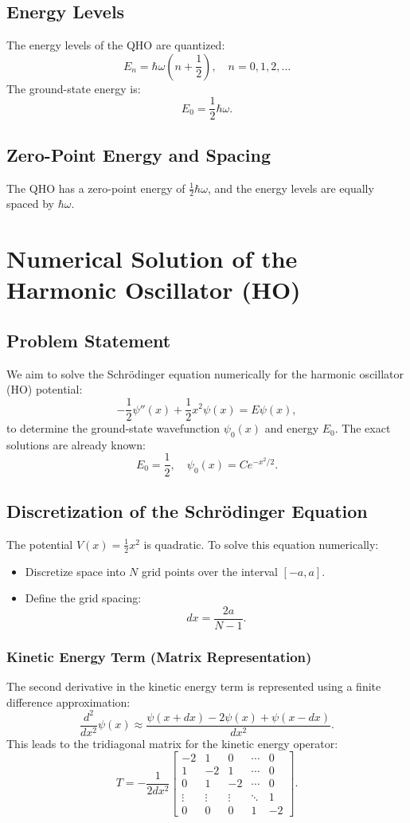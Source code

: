 \documentclass[a4paper,12pt]{article}
\begin{document}
\begin{multicols}{2}
\subsection*{Energy Levels}
The energy levels of the QHO are quantized:
\[
E_n = \hbar\omega\left(n + \frac{1}{2}\right), \quad n = 0, 1, 2, \dots
\]
The ground-state energy is:
\[
E_0 = \frac{1}{2}\hbar\omega.
\]

\subsection*{Zero-Point Energy and Spacing}
The QHO has a zero-point energy of \( \frac{1}{2}\hbar\omega \), and the energy levels are equally spaced by \( \hbar\omega \).

\section{Numerical Solution of the Harmonic Oscillator (HO)}

\subsection*{Problem Statement}
We aim to solve the Schrödinger equation numerically for the harmonic oscillator (HO) potential:
\[
-\frac{1}{2}\psi''(x) + \frac{1}{2}x^2 \psi(x) = E \psi(x),
\]
to determine the ground-state wavefunction \( \psi_0(x) \) and energy \( E_0 \). The exact solutions are already known:
\[
E_0 = \frac{1}{2}, \quad \psi_0(x) = Ce^{-x^2/2}.
\]

\subsection*{Discretization of the Schrödinger Equation}
The potential \( V(x) = \frac{1}{2}x^2 \) is quadratic. To solve this equation numerically:
\begin{itemize}
    \item Discretize space into \( N \) grid points over the interval \([-a, a]\).
    \item Define the grid spacing:
    \[
    dx = \frac{2a}{N-1}.
    \]
\end{itemize}

\subsubsection*{Kinetic Energy Term (Matrix Representation)}
The second derivative in the kinetic energy term is represented using a finite difference approximation:
\[
\frac{d^2}{dx^2}\psi(x) \approx \frac{\psi(x+dx) - 2\psi(x) + \psi(x-dx)}{dx^2}.
\]
This leads to the tridiagonal matrix for the kinetic energy operator:
\[
T = -\frac{1}{2dx^2}
\begin{bmatrix}
-2 & 1 & 0 & \cdots & 0 \\
1 & -2 & 1 & \cdots & 0 \\
0 & 1 & -2 & \cdots & 0 \\
\vdots & \vdots & \vdots & \ddots & 1 \\
0 & 0 & 0 & 1 & -2
\end{bmatrix}.
\]


\end{multicols}
\end{document}
